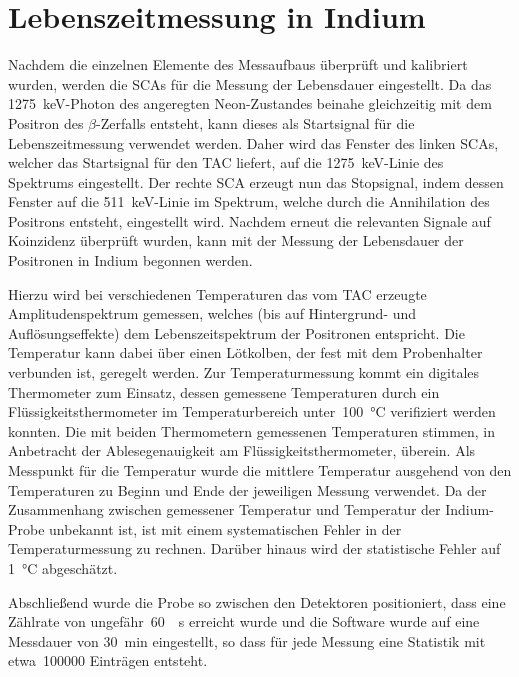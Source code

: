 \documentclass[11pt, a4paper]{article}
\numberwithin{equation}{section}
\begin{document}
\clearpage
\section{Lebenszeitmessung in Indium}
Nachdem die einzelnen Elemente des Messaufbaus überprüft und kalibriert wurden, werden die SCAs für die Messung der Lebensdauer eingestellt.
Da das \SI{1275}{\keV}-Photon des angeregten Neon-Zustandes beinahe gleichzeitig mit dem Positron des $\beta$-Zerfalls entsteht, kann dieses als Startsignal für die Lebenszeitmessung verwendet werden.
Daher wird das Fenster des linken SCAs, welcher das Startsignal für den TAC liefert, auf die \SI{1275}{\keV}-Linie des Spektrums eingestellt.
Der rechte SCA erzeugt nun das Stopsignal, indem dessen Fenster auf die \SI{511}{\keV}-Linie im Spektrum, welche durch die Annihilation des Positrons entsteht, eingestellt wird.
Nachdem erneut die relevanten Signale auf Koinzidenz überprüft wurden, kann mit der Messung der Lebensdauer der Positronen in Indium begonnen werden.

Hierzu wird bei verschiedenen Temperaturen das vom TAC erzeugte Amplitudenspektrum gemessen, welches (bis auf Hintergrund- und Auflösungseffekte) dem Lebenszeitspektrum der Positronen entspricht.
Die Temperatur kann dabei über einen Lötkolben, der fest mit dem Probenhalter verbunden ist, geregelt werden.
Zur Temperaturmessung kommt ein digitales Thermometer zum Einsatz, dessen gemessene Temperaturen durch ein Flüssigkeitsthermometer im Temperaturbereich unter~\SI{100}{\degreeCelsius} verifiziert werden konnten.
Die mit beiden Thermometern gemessenen Temperaturen stimmen, in Anbetracht der Ablesegenauigkeit am Flüssigkeitsthermometer, überein.
Als Messpunkt für die Temperatur wurde die mittlere Temperatur ausgehend von den Temperaturen zu Beginn und Ende der jeweiligen Messung verwendet.
Da der Zusammenhang zwischen gemessener Temperatur und Temperatur der Indium-Probe unbekannt ist, ist mit einem systematischen Fehler in der Temperaturmessung zu rechnen.
Darüber hinaus wird der statistische Fehler auf \SI{1}{\degreeCelsius} abgeschätzt.

Abschließend wurde die Probe so zwischen den Detektoren positioniert, dass eine Zählrate von ungefähr~\SI{60}{\per\second} erreicht wurde und die Software wurde auf eine Messdauer von \SI{30}{min} eingestellt, so dass für jede Messung eine Statistik mit etwa~\num{100000} Einträgen entsteht.
\end{document}
